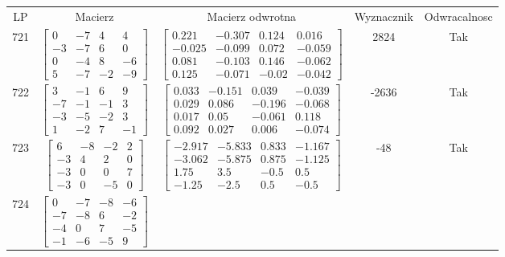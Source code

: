 \documentclass[a4paper,12pt]{article}
\begin{document}
\bgroup {} \vspace{0.2in} \begin{tabular}{c c c c c}
LP & Macierz & Macierz odwrotna & Wyznacznik & Odwracalnosc\\
721
&
$\begin{bmatrix} 0 & -7 & 4 & 4 \\ -3 & -7 & 6 & 0 \\ 0 & -4 & 8 & -6 \\ 5 & -7 & -2 & -9 \end{bmatrix}$
&
$\begin{bmatrix} 0.221 & -0.307 & 0.124 & 0.016 \\ -0.025 & -0.099 & 0.072 & -0.059 \\ 0.081 & -0.103 & 0.146 & -0.062 \\ 0.125 & -0.071 & -0.02 & -0.042 \end{bmatrix}$
&
2824
&
Tak
\\
722
&
$\begin{bmatrix} 3 & -1 & 6 & 9 \\ -7 & -1 & -1 & 3 \\ -3 & -5 & -2 & 3 \\ 1 & -2 & 7 & -1 \end{bmatrix}$
&
$\begin{bmatrix} 0.033 & -0.151 & 0.039 & -0.039 \\ 0.029 & 0.086 & -0.196 & -0.068 \\ 0.017 & 0.05 & -0.061 & 0.118 \\ 0.092 & 0.027 & 0.006 & -0.074 \end{bmatrix}$
&
-2636
&
Tak
\\
723
&
$\begin{bmatrix} 6 & -8 & -2 & 2 \\ -3 & 4 & 2 & 0 \\ -3 & 0 & 0 & 7 \\ -3 & 0 & -5 & 0 \end{bmatrix}$
&
$\begin{bmatrix} -2.917 & -5.833 & 0.833 & -1.167 \\ -3.062 & -5.875 & 0.875 & -1.125 \\ 1.75 & 3.5 & -0.5 & 0.5 \\ -1.25 & -2.5 & 0.5 & -0.5 \end{bmatrix}$
&
-48
&
Tak
\\
724
&
$\begin{bmatrix} 0 & -7 & -8 & -6 \\ -7 & -8 & 6 & -2 \\ -4 & 0 & 7 & -5 \\ -1 & -6 & -5 & 9 \end{bmatrix}$

\end{tabular}
\end{document}
